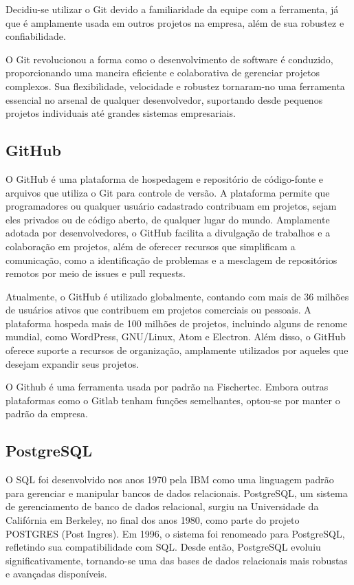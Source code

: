 Decidiu-se utilizar o Git devido a familiaridade da equipe com a ferramenta, já que é amplamente usada em outros projetos na empresa, além de sua robustez e confiabilidade.
 
O Git revolucionou a forma como o desenvolvimento de software é conduzido, proporcionando uma maneira eficiente e colaborativa de gerenciar projetos complexos. Sua flexibilidade, velocidade e robustez tornaram-no uma ferramenta essencial no arsenal de qualquer desenvolvedor, suportando desde pequenos projetos individuais até grandes sistemas empresariais.

\subsection{GitHub}

O GitHub é uma plataforma de hospedagem e repositório de código-fonte e arquivos que utiliza o Git para controle de versão. A plataforma permite que programadores ou qualquer usuário cadastrado contribuam em projetos, sejam eles privados ou de código aberto, de qualquer lugar do mundo. Amplamente adotada por desenvolvedores, o GitHub facilita a divulgação de trabalhos e a colaboração em projetos, além de oferecer recursos que simplificam a comunicação, como a identificação de problemas e a mesclagem de repositórios remotos por meio de issues e pull requests.

Atualmente, o GitHub é utilizado globalmente, contando com mais de 36 milhões de usuários ativos que contribuem em projetos comerciais ou pessoais. A plataforma hospeda mais de 100 milhões de projetos, incluindo alguns de renome mundial, como WordPress, GNU/Linux, Atom e Electron. Além disso, o GitHub oferece suporte a recursos de organização, amplamente utilizados por aqueles que desejam expandir seus projetos.

O Github é uma ferramenta usada por padrão na Fischertec. Embora outras plataformas como o Gitlab tenham funções semelhantes, optou-se por manter o padrão da empresa.

\subsection{PostgreSQL}

O \acrlong{SQL} foi desenvolvido nos anos 1970 pela IBM como uma linguagem padrão para gerenciar e manipular bancos de dados relacionais. PostgreSQL, um sistema de gerenciamento de banco de dados relacional, surgiu na Universidade da Califórnia em Berkeley, no final dos anos 1980, como parte do projeto POSTGRES (Post Ingres). Em 1996, o sistema foi renomeado para PostgreSQL, refletindo sua compatibilidade com SQL. Desde então, PostgreSQL evoluiu significativamente, tornando-se uma das bases de dados relacionais mais robustas e avançadas disponíveis.

